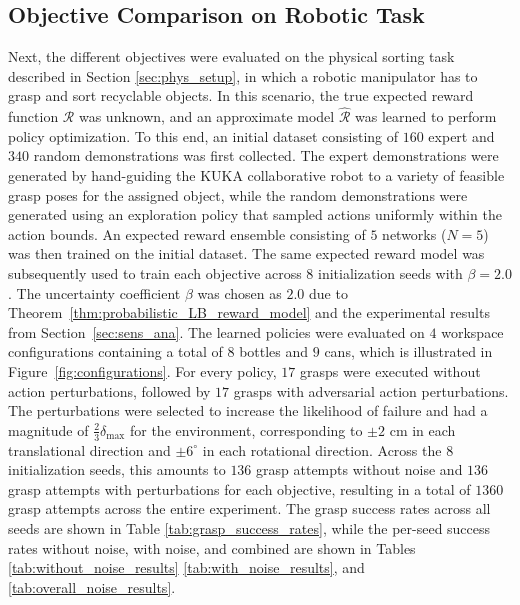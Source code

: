 \documentclass[./dissertation.tex]{subfiles}
\begin{document}
\subsection{Objective Comparison on Robotic Task}
Next, the different objectives were evaluated on the physical sorting task described in Section \ref{sec:phys_setup}, in which a robotic manipulator has to grasp and sort recyclable objects. In this scenario, the true expected reward function $\mathcal{R}$ was unknown, and an approximate model $\hat{\mathcal{R}}$ was learned to perform policy optimization. To this end, an initial dataset consisting of $160$ expert and $340$ random demonstrations was first collected. The expert demonstrations were generated by hand-guiding the KUKA collaborative robot to a variety of feasible grasp poses for the assigned object, while the random demonstrations were generated using an exploration policy that sampled actions uniformly within the action bounds. An expected reward ensemble consisting of $5$ networks ($N=5$) was then trained on the initial dataset. The same expected reward model was subsequently used to train each objective across $8$ initialization seeds with $\beta=2.0$. The uncertainty coefficient $\beta$ was chosen as $2.0$ due to Theorem~\ref{thm:probabilistic_LB_reward_model} and the experimental results from Section~\ref{sec:sens_ana}. The learned policies were evaluated on $4$ workspace configurations containing a total of $8$ bottles and $9$ cans, which is illustrated in Figure~\ref{fig:configurations}. For every policy, $17$ grasps were executed without action perturbations, followed by $17$ grasps with adversarial action perturbations. The perturbations were selected to increase the likelihood of failure and had a magnitude of $\frac{2}{3} \delta_{\text{max}}$ for the environment, corresponding to $\pm2$ cm in each translational direction and $\pm6^\circ$ in each rotational direction. Across the $8$ initialization seeds, this amounts to $136$ grasp attempts without noise and $136$ grasp attempts with perturbations for each objective, resulting in a total of $1360$ grasp attempts across the entire experiment.
The grasp success rates across all seeds are shown in Table \ref{tab:grasp_success_rates}, while the per-seed success rates without noise, with noise, and combined are shown in Tables \ref{tab:without_noise_results} \ref{tab:with_noise_results}, and \ref{tab:overall_noise_results}.
\end{document}
